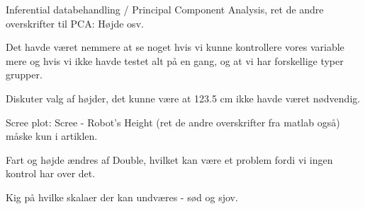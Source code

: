 Inferential databehandling / Principal Component Analysis, ret de andre overskrifter til PCA: Højde osv. 

Det havde været nemmere at se noget hvis vi kunne kontrollere vores variable mere og hvis vi ikke havde testet alt på en gang, og at vi har forskellige typer grupper. 

Diskuter valg af højder, det kunne være at 123.5 cm ikke havde været nødvendig. 

Scree plot: Scree - Robot's Height (ret de andre overskrifter fra matlab også) måske kun i artiklen. 


Fart og højde ændres af Double, hvilket kan være et problem fordi vi ingen kontrol har over det. 


Kig på hvilke skalaer der kan undværes - sød og sjov. 




 




 










